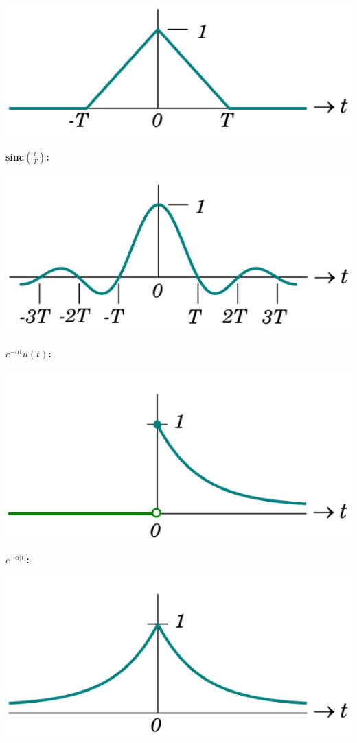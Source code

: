 \documentclass[landscape,a4paper]{extarticle}
\newenvironment{Figure}
  {\par\medskip\noindent\minipage{\linewidth}}
  {\endminipage\par\medskip}
\begin{document}
\begin{multicols*}{5}
    \begin{Figure}
        \centering
        \includegraphics[width=0.8\linewidth]{images/tri.png}
    \end{Figure}
    \textbf{sinc$\left(\frac{t}{T}\right)$:}
    \begin{Figure}
        \centering
        \includegraphics[width=0.8\linewidth]{images/sinc.png}
    \end{Figure}
    \textbf{$e^{-\alpha t}u(t)$: }
    \begin{Figure}
        \centering
        \includegraphics[width=0.8\linewidth]{images/rightSidedDecayingExp.png}
    \end{Figure}
    \textbf{$e^{-\alpha |t|}$: }
    \begin{Figure}
        \centering
        \includegraphics[width=0.8\linewidth]{images/twoSidedDecayingExp.png}

\end{Figure}
\end{multicols*}
\end{document}
